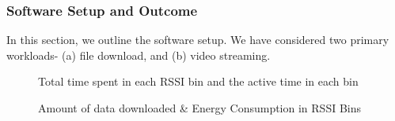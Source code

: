\subsubsection{Software Setup and Outcome}
\indent In this section, we outline the software setup. We have considered two primary workloads- (a) file download, and (b) video streaming. \\
\begin{figure}[h]
    \centering
    \caption{Total time spent in each \ac{RSSI} bin and the active time in each bin}
    \label{fig:vid_time}
\end{figure}
\begin{figure}[h]
    \centering
    \caption{Amount of data downloaded \& Energy Consumption in \ac{RSSI} Bins}
    \label{fig:vid_thpt}
\end{figure}

